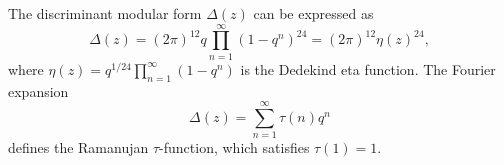 The discriminant modular form $\Delta(z)$ can be expressed as
$$
\Delta(z) = (2\pi)^{12} q \prod_{n=1}^\infty (1 - q^n)^{24} = (2\pi)^{12} \eta(z)^{24},
$$
where $\eta(z) = q^{1/24} \prod_{n=1}^\infty (1 - q^n)$ is the Dedekind eta function. The Fourier expansion
$$
\Delta(z) = \sum_{n=1}^\infty \tau(n) q^n
$$
defines the Ramanujan $\tau$-function, which satisfies $\tau(1) = 1$.
